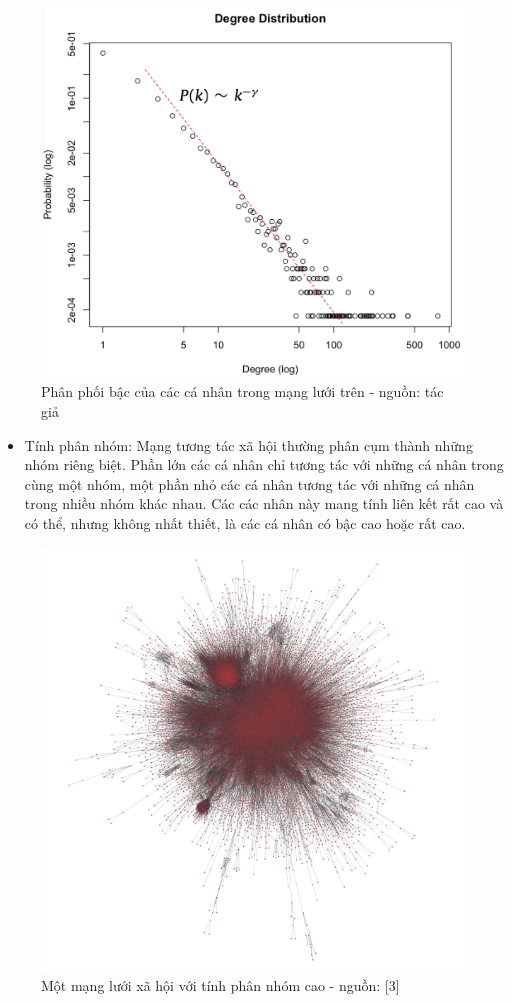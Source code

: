\documentclass[]{book}
\providecommand{\tightlist}{%
  \setlength{\itemsep}{0pt}\setlength{\parskip}{0pt}}
\begin{document}
\begin{figure}

{\centering \includegraphics[width=0.5\linewidth]{images/bitcoin_degree_dist_2} 

}

\caption{Phân phối bậc của các cá nhân trong mạng lưới trên - nguồn: tác giả}\label{fig:network1dist}
\end{figure}

\begin{itemize}
\tightlist
\item
  Tính phân nhóm: Mạng tương tác xã hội thường phân cụm thành những nhóm
  riêng biệt. Phần lớn các cá nhân chỉ tương tác với những cá nhân trong
  cùng một nhóm, một phần nhỏ các cá nhân tương tác với những cá nhân
  trong nhiều nhóm khác nhau. Các các nhân này mang tính liên kết rất
  cao và có thể, nhưng không nhất thiết, là các cá nhân có bậc cao hoặc
  rất cao.
\end{itemize}

\begin{figure}

{\centering \includegraphics[width=0.6\linewidth]{images/public-figure} 

}

\caption{Một mạng lưới xã hội với tính phân nhóm cao - nguồn: [3]}\label{fig:network2}
\end{figure}
\end{document}
